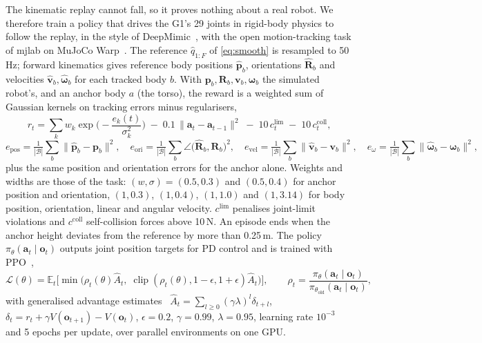 \documentclass[10pt]{article}
\newcommand{\clip}{\operatorname{clip}}
\begin{document}
The kinematic replay cannot fall, so it proves nothing about a real robot. We therefore train a policy that drives the G1's 29 joints in rigid-body physics to follow the replay, in the style of DeepMimic~\cite{peng2018deepmimic}, with the open motion-tracking task of mjlab on MuJoCo Warp~\cite{todorov2012mujoco}. The reference $\hat q_{1:F}$ of \cref{eq:smooth} is resampled to 50\,Hz; forward kinematics gives reference body positions $\hat{\mathbf{p}}_b$, orientations $\hat{\mathbf{R}}_b$ and velocities $\hat{\mathbf{v}}_b,\hat{\boldsymbol\omega}_b$ for each tracked body $b$. With $\mathbf{p}_b,\mathbf{R}_b,\mathbf{v}_b,\boldsymbol\omega_b$ the simulated robot's, and an anchor body $a$ (the torso), the reward is a weighted sum of Gaussian kernels on tracking errors minus regularisers,
\begin{equation}
  r_t = \sum_{k} w_k \exp\!\Big(-\frac{e_k(t)}{\sigma_k^2}\Big) \;-\; 0.1\,\|\mathbf{a}_t-\mathbf{a}_{t-1}\|^2 \;-\; 10\,c^{\mathrm{lim}}_t \;-\; 10\,c^{\mathrm{coll}}_t,
  \label{eq:track-reward}
\end{equation}
\begin{equation}
  e_{\mathrm{pos}} = \tfrac{1}{|\mathcal{B}|}\textstyle\sum_{b}\|\hat{\mathbf{p}}_b-\mathbf{p}_b\|^2,\quad
  e_{\mathrm{ori}} = \tfrac{1}{|\mathcal{B}|}\textstyle\sum_{b}\angle\big(\hat{\mathbf{R}}_b,\mathbf{R}_b\big)^2,\quad
  e_{\mathrm{vel}} = \tfrac{1}{|\mathcal{B}|}\textstyle\sum_{b}\|\hat{\mathbf{v}}_b-\mathbf{v}_b\|^2,\quad
  e_{\omega} = \tfrac{1}{|\mathcal{B}|}\textstyle\sum_{b}\|\hat{\boldsymbol\omega}_b-\boldsymbol\omega_b\|^2,
  \label{eq:track-errors}
\end{equation}
plus the same position and orientation errors for the anchor alone. Weights and widths are those of the task: $(w,\sigma)=(0.5,0.3)$ and $(0.5,0.4)$ for anchor position and orientation, $(1,0.3)$, $(1,0.4)$, $(1,1.0)$ and $(1,3.14)$ for body position, orientation, linear and angular velocity. $c^{\mathrm{lim}}$ penalises joint-limit violations and $c^{\mathrm{coll}}$ self-collision forces above 10\,N. An episode ends when the anchor height deviates from the reference by more than 0.25\,m. The policy $\pi_\theta(\mathbf{a}_t\mid\mathbf{o}_t)$ outputs joint position targets for PD control and is trained with PPO~\cite{schulman2017ppo},
\begin{equation}
  \mathcal{L}(\theta) = \mathbb{E}_t\Big[\min\big(\rho_t(\theta)\hat A_t,\;\clip(\rho_t(\theta),1-\epsilon,1+\epsilon)\hat A_t\big)\Big], \qquad
  \rho_t = \frac{\pi_\theta(\mathbf{a}_t\mid\mathbf{o}_t)}{\pi_{\theta_{\mathrm{old}}}(\mathbf{a}_t\mid\mathbf{o}_t)},
  \label{eq:ppo}
\end{equation}
with generalised advantage estimates~\cite{schulman2016gae} $\hat A_t=\sum_{l\ge0}(\gamma\lambda)^l\delta_{t+l}$, $\delta_t=r_t+\gamma V(\mathbf{o}_{t+1})-V(\mathbf{o}_t)$, $\epsilon=0.2$, $\gamma=0.99$, $\lambda=0.95$, learning rate $10^{-3}$ and 5 epochs per update, over \PhysEnvs{} parallel environments on one \PhysGPU{} GPU.
\end{document}
